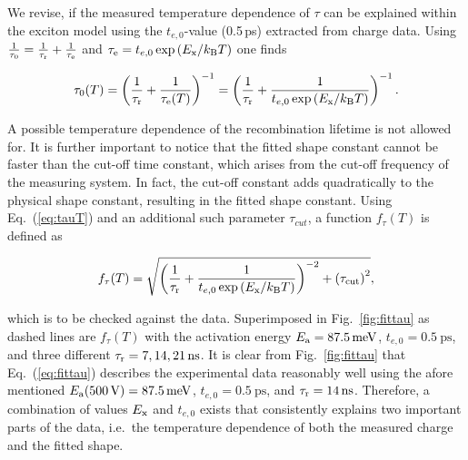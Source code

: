
We revise, if the measured temperature dependence of $\tau$ can be explained within the exciton model
 using the $t_{e,0}$-value (0.5\,ps) extracted from charge data. 
Using $\frac{1}{\tau_{0}} =  \frac{1}{\tau_\textrm{r}} + \frac{1}{\tau_\textrm{e}}$ and $\tau_\textrm{e} = t_{e,0} \exp{\left( E_{\textrm{x}}/k_{\textrm{B}}T \right)}$ one finds

\begin{equation}
 \tau_{0}(T) = \left( \frac{1}{\tau_\textrm{r}} + \frac{1}{\tau_\textrm{e}(T)} \right)^{-1} = \left( \frac{1}{\tau_\textrm{r}} + \frac{1}{t_{e,0} \exp{\left( E_{\textrm{x}}/k_{\textrm{B}}T \right)} }\right)^{-1}.
 \label{eq:tauT}
\end{equation}

\noindent
A possible temperature dependence of the recombination lifetime is not allowed for. 
It is further important to notice that
 the fitted shape constant cannot be faster than the cut-off time constant, which arises from the cut-off frequency of the measuring system. 
In fact, the cut-off constant adds quadratically to the physical shape constant, resulting in the fitted shape constant.
Using Eq.~(\ref{eq:tauT}) and an additional such parameter $\tau_{cut}$, a function $f_{\tau}(T)$ is defined  as

\begin{equation}
 f_{\tau}(T) = \sqrt{\left( \frac{1}{\tau_\textrm{r}} + \frac{1}{t_{e,0} \exp{\left( E_{\textrm{x}}/k_{\textrm{B}}T \right)} }\right)^{-2} + \left( \tau_{\textrm{cut}}\right)^2},
 \label{eq:fittau}
\end{equation}

\noindent
which is to be checked against the data. 
Superimposed in Fig.~\ref{fig:fittau} as dashed lines are $f_{\tau}(T)$ with the activation energy $\Ea = \SI{87.5}{\milli\eV}$, $t_{e,0} = \SI{0.5}{\ps}$,
 and three different $\tau_\textrm{r} = 7,14,\SI{21}{\nano\second}$. 
It is clear from Fig.~\ref{fig:fittau} that Eq.~(\ref{eq:fittau}) describes the experimental data reasonably well
 using the afore mentioned $\Ea(\SI{500}{\volt}) = \SI{87.5}{\milli\eV}$, $t_{e,0} = \SI{0.5}{\ps}$, and $\taurec = \SI{14}{\ns}$. 
Therefore, a combination of values $E_{\textrm{x}}$ and $t_{e,0}$ exists that consistently explains two important parts of the data,
 i.e.~the temperature dependence of both the measured charge and the fitted shape. 


